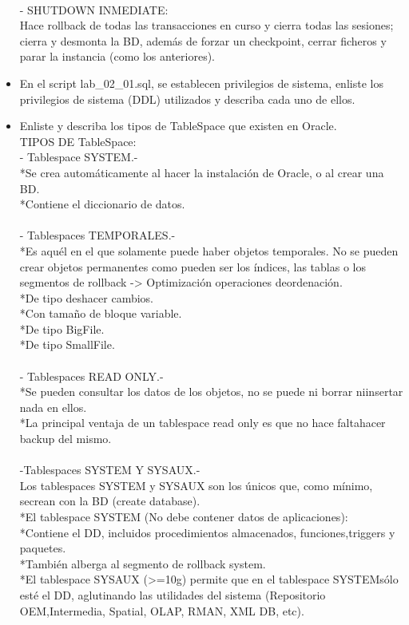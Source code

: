 \begin{itemize}
   \\- SHUTDOWN INMEDIATE:
   \\Hace rollback de todas las transacciones en curso y cierra todas las sesiones; cierra y desmonta la BD, además de forzar un checkpoint, cerrar ficheros y parar la instancia (como los anteriores).
   \\
   \item En el script lab_02_01.sql, se establecen privilegios de sistema, enliste los privilegios de sistema (DDL) 
   utilizados y describa cada uno de ellos.
   \\

   \item Enliste y describa los tipos de TableSpace que existen en Oracle.
   \\TIPOS DE TableSpace:
   \\- Tablespace SYSTEM.-
   \\*Se crea automáticamente al hacer la instalación de Oracle, o al crear una BD.
   \\*Contiene el diccionario de datos.
   \\
   \\- Tablespaces TEMPORALES.-
   \\*Es aquél en el que solamente puede haber objetos temporales. No se pueden crear objetos permanentes como pueden ser los índices, las tablas o los segmentos de rollback -> Optimización operaciones deordenación.
   \\*De tipo deshacer cambios.
   \\*Con tamaño de bloque variable.
   \\*De tipo BigFile.
   \\*De tipo SmallFile.
   \\
   \\- Tablespaces READ ONLY.-
   \\*Se pueden consultar los datos de los objetos, no se puede ni borrar niinsertar nada en ellos.
   \\*La principal ventaja de un tablespace read only es que no hace faltahacer backup del mismo.
   \\
   \\-Tablespaces SYSTEM Y SYSAUX.-
   \\Los tablespaces SYSTEM y SYSAUX son los únicos que, como mínimo, secrean con la BD (create database).
   \\*El tablespace SYSTEM (No debe contener datos de aplicaciones):
   \\*Contiene el DD, incluidos procedimientos almacenados, funciones,triggers y paquetes.
   \\*También alberga al segmento de rollback system.
   \\*El tablespace SYSAUX (>=10g) permite que en el tablespace SYSTEMsólo esté el DD, aglutinando las utilidades del sistema (Repositorio OEM,Intermedia, Spatial, OLAP, RMAN, XML DB, etc).
 \\
 \end{itemize}
